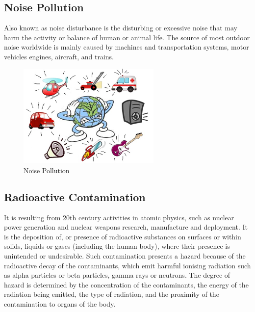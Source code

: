 \subsection{Noise Pollution}
Also known as noise disturbance is the disturbing or excessive noise that may harm the activity or balance of human or animal life. The source of most outdoor noise worldwide is mainly caused by machines and transportation systems, motor vehicles engines, aircraft, and trains.


\begin{figure}[h]
\centering
  \includegraphics[width=70mm]{noise_pollution.jpg}
  \caption{Noise Pollution \cite{5}}
  \label{fig:Noise Pollution}
\end{figure}


\subsection{Radioactive Contamination}
It is resulting from 20th century activities in atomic physics, such as nuclear power generation and nuclear weapons research, manufacture and deployment. It is the deposition of, or presence of radioactive substances on surfaces or within solids, liquids or gases (including the human body), where their presence is unintended or undesirable. Such contamination presents a hazard because of the radioactive decay of the contaminants, which emit harmful ionising radiation such as alpha particles or beta particles, gamma rays or neutrons. The degree of hazard is determined by the concentration of the contaminants, the energy of the radiation being emitted, the type of radiation, and the proximity of the contamination to organs of the body.
%




